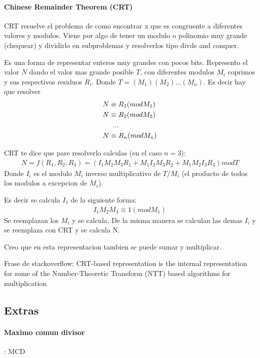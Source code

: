 \documentclass[12pt, oneside]{article}
\begin{document}
\paragraph{Chinese Remainder Theorem (CRT)}
CRT resuelve el problema de como encontrar x que es congruente a diferentes valores y modulos.
Viene por algo de tener un modulo o polinomio muy grande (chequear) y dividirlo en
subproblemas y resolverlos tipo divde and conquer.

Es una forma de representar enteros muy grandes con pocos bits.
Represento el valor $N$ dando el valor mas grande posible $T$, con diferentes modulos $M_i$
coprimos y sus respectivos residuos $R_i$.
Donde $T=(M_1)(M_2)...(M_n)$.
Es decir hay que resolver
\begin{align*}
  &N \equiv R_1 (mod M_1) \\
  & N \equiv R_2 (mod M_2) \\
  & \hspace{0.5cm}... \\
  &N \equiv R_n (mod M_n)
\end{align*}

CRT te dice que pare resolverlo calculas (en el caso $n=3$):
\begin{align*}
  N = f(R_1,R_2,R_3) =  (I_1M_2M_3R_1 + M_1I_2M_3R_2 + M_1M_2I_3R_3) mod T
\end{align*}
Donde $I_i$ es el modulo $M_i$ inverso multiplicativo de $T/M_i$ (el producto
de todos los modulos a excepcion de $M_i$).

Es decir se calcula $I_1$ de la siguiente forma:
\begin{align*}
  I_1M_2M_3 \equiv 1 (mod M_1)
\end{align*}
Se reemplazan los $M_i$ y se calcula.
De la misma manera se calculan las demas $I_i$ y se reemplaza con CRT y se calcula N.

Creo que en esta representacion tambien se puede sumar y multiplicar.


Frase de stackoverflow: CRT-based representation is the internal representation
for some of the Number-Theoretic Transform (NTT) based algorithms for multiplication
\subsection{Extras}
\paragraph{Maximo comun divisor}: MCD
\end{document}
